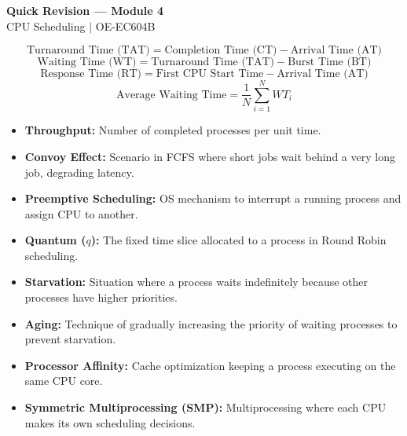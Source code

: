 \documentclass[12pt,a4paper]{article}
\begin{document}
\newpage
\begin{center}
  {\large\bfseries\color{myred} Quick Revision --- Module 4}\\[3pt]
  {\small\color{mydark} CPU Scheduling $|$ OE-EC604B}
\end{center}
\noindent{\color{myred}\rule{\linewidth}{1.2pt}}
\vspace{4pt}

\begin{tcolorbox}[formulabox, title={\textbf{Core Scheduling Formulas}}]
$$\text{Turnaround Time (TAT)} = \text{Completion Time (CT)} - \text{Arrival Time (AT)}$$
$$\text{Waiting Time (WT)} = \text{Turnaround Time (TAT)} - \text{Burst Time (BT)}$$
$$\text{Response Time (RT)} = \text{First CPU Start Time} - \text{Arrival Time (AT)}$$
$$\text{Average Waiting Time} = \frac{1}{N}\sum_{i=1}^{N} WT_i$$
\end{tcolorbox}

\begin{tcolorbox}[defbox, title={\textbf{One-Line Definitions}}]
\begin{itemize}[leftmargin=*, itemsep=2.5pt, topsep=0pt]
  \item \textbf{Throughput:} Number of completed processes per unit time.
  \item \textbf{Convoy Effect:} Scenario in FCFS where short jobs wait behind a very long job, degrading latency.
  \item \textbf{Preemptive Scheduling:} OS mechanism to interrupt a running process and assign CPU to another.
  \item \textbf{Quantum ($q$):} The fixed time slice allocated to a process in Round Robin scheduling.
  \item \textbf{Starvation:} Situation where a process waits indefinitely because other processes have higher priorities.
  \item \textbf{Aging:} Technique of gradually increasing the priority of waiting processes to prevent starvation.
  \item \textbf{Processor Affinity:} Cache optimization keeping a process executing on the same CPU core.
  \item \textbf{Symmetric Multiprocessing (SMP):} Multiprocessing where each CPU makes its own scheduling decisions.
\end{itemize}
\end{tcolorbox}
\end{document}
